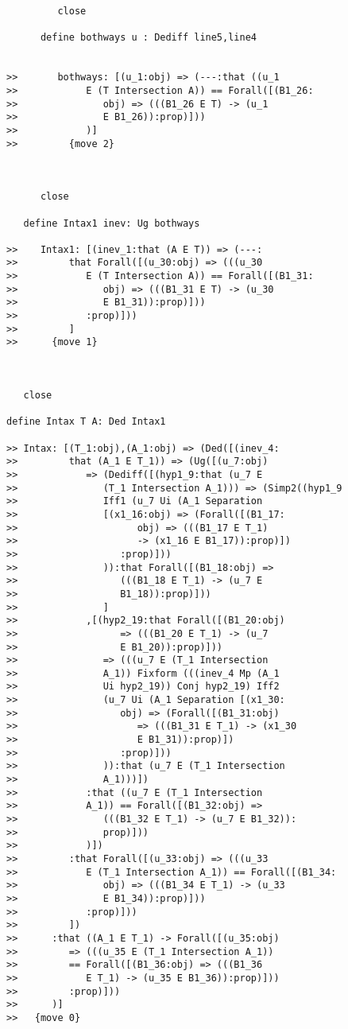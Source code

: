 \documentclass[12pt]{article}
\begin{document}
\begin{verbatim}
         close

      define bothways u : Dediff line5,line4


>>       bothways: [(u_1:obj) => (---:that ((u_1
>>            E (T Intersection A)) == Forall([(B1_26:
>>               obj) => (((B1_26 E T) -> (u_1
>>               E B1_26)):prop)]))
>>            )]
>>         {move 2}



      close

   define Intax1 inev: Ug bothways

>>    Intax1: [(inev_1:that (A E T)) => (---:
>>         that Forall([(u_30:obj) => (((u_30
>>            E (T Intersection A)) == Forall([(B1_31:
>>               obj) => (((B1_31 E T) -> (u_30
>>               E B1_31)):prop)]))
>>            :prop)]))
>>         ]
>>      {move 1}



   close

define Intax T A: Ded Intax1

>> Intax: [(T_1:obj),(A_1:obj) => (Ded([(inev_4:
>>         that (A_1 E T_1)) => (Ug([(u_7:obj)
>>            => (Dediff([(hyp1_9:that (u_7 E
>>               (T_1 Intersection A_1))) => (Simp2((hyp1_9
>>               Iff1 (u_7 Ui (A_1 Separation
>>               [(x1_16:obj) => (Forall([(B1_17:
>>                     obj) => (((B1_17 E T_1)
>>                     -> (x1_16 E B1_17)):prop)])
>>                  :prop)]))
>>               )):that Forall([(B1_18:obj) =>
>>                  (((B1_18 E T_1) -> (u_7 E
>>                  B1_18)):prop)]))
>>               ]
>>            ,[(hyp2_19:that Forall([(B1_20:obj)
>>                  => (((B1_20 E T_1) -> (u_7
>>                  E B1_20)):prop)]))
>>               => (((u_7 E (T_1 Intersection
>>               A_1)) Fixform (((inev_4 Mp (A_1
>>               Ui hyp2_19)) Conj hyp2_19) Iff2
>>               (u_7 Ui (A_1 Separation [(x1_30:
>>                  obj) => (Forall([(B1_31:obj)
>>                     => (((B1_31 E T_1) -> (x1_30
>>                     E B1_31)):prop)])
>>                  :prop)]))
>>               )):that (u_7 E (T_1 Intersection
>>               A_1)))])
>>            :that ((u_7 E (T_1 Intersection
>>            A_1)) == Forall([(B1_32:obj) =>
>>               (((B1_32 E T_1) -> (u_7 E B1_32)):
>>               prop)]))
>>            )])
>>         :that Forall([(u_33:obj) => (((u_33
>>            E (T_1 Intersection A_1)) == Forall([(B1_34:
>>               obj) => (((B1_34 E T_1) -> (u_33
>>               E B1_34)):prop)]))
>>            :prop)]))
>>         ])
>>      :that ((A_1 E T_1) -> Forall([(u_35:obj)
>>         => (((u_35 E (T_1 Intersection A_1))
>>         == Forall([(B1_36:obj) => (((B1_36
>>            E T_1) -> (u_35 E B1_36)):prop)]))
>>         :prop)]))
>>      )]
>>   {move 0}


\end{verbatim}
\end{document}
